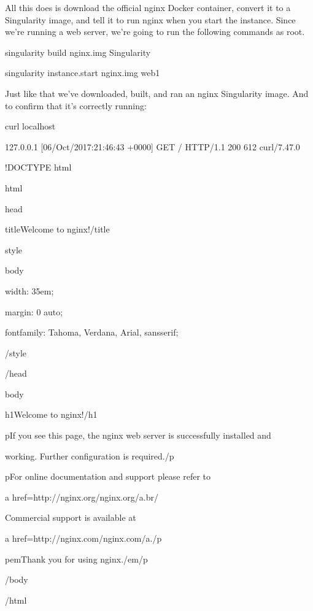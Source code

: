 \documentclass[letterpaper,10pt,english]{sphinxmanual}
\begin{document}
All this does is download the official nginx Docker container, convert
it to a Singularity image, and tell it to run nginx when you start the
instance. Since we’re running a web server, we’re going to run the
following commands as root.

%
\begin{sphinxVerbatim}[commandchars=\\\{\}]
\PYGZsh{} singularity build nginx.img Singularity

\PYGZsh{} singularity instance.start nginx.img web1
\end{sphinxVerbatim}

Just like that we’ve downloaded, built, and ran an nginx Singularity
image. And to confirm that it’s correctly running:

%
\begin{sphinxVerbatim}[commandchars=\\\{\}]
\PYGZdl{} curl localhost

127.0.0.1 \PYGZhy{} \PYGZhy{} [06/Oct/2017:21:46:43 +0000] \PYGZdq{}GET / HTTP/1.1\PYGZdq{} 200 612 \PYGZdq{}\PYGZhy{}\PYGZdq{} \PYGZdq{}curl/7.47.0\PYGZdq{} \PYGZdq{}\PYGZhy{}\PYGZdq{}

\PYGZlt{}!DOCTYPE html\PYGZgt{}

\PYGZlt{}html\PYGZgt{}

\PYGZlt{}head\PYGZgt{}

\PYGZlt{}title\PYGZgt{}Welcome to nginx!\PYGZlt{}/title\PYGZgt{}

\PYGZlt{}style\PYGZgt{}

    body \PYGZob{}

        width: 35em;

        margin: 0 auto;

        font\PYGZhy{}family: Tahoma, Verdana, Arial, sans\PYGZhy{}serif;

    \PYGZcb{}

\PYGZlt{}/style\PYGZgt{}

\PYGZlt{}/head\PYGZgt{}

\PYGZlt{}body\PYGZgt{}

\PYGZlt{}h1\PYGZgt{}Welcome to nginx!\PYGZlt{}/h1\PYGZgt{}

\PYGZlt{}p\PYGZgt{}If you see this page, the nginx web server is successfully installed and

working. Further configuration is required.\PYGZlt{}/p\PYGZgt{}


\PYGZlt{}p\PYGZgt{}For online documentation and support please refer to

\PYGZlt{}a href=\PYGZdq{}http://nginx.org/\PYGZdq{}\PYGZgt{}nginx.org\PYGZlt{}/a\PYGZgt{}.\PYGZlt{}br/\PYGZgt{}

Commercial support is available at

\PYGZlt{}a href=\PYGZdq{}http://nginx.com/\PYGZdq{}\PYGZgt{}nginx.com\PYGZlt{}/a\PYGZgt{}.\PYGZlt{}/p\PYGZgt{}


\PYGZlt{}p\PYGZgt{}\PYGZlt{}em\PYGZgt{}Thank you for using nginx.\PYGZlt{}/em\PYGZgt{}\PYGZlt{}/p\PYGZgt{}

\PYGZlt{}/body\PYGZgt{}

\PYGZlt{}/html\PYGZgt{}
\end{sphinxVerbatim}
\end{document}
